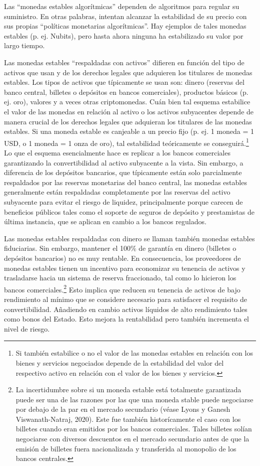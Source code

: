 \documentclass[10pt,spanish]{article}
\begin{document}
Las ``monedas estables algorítmicas'' dependen de algoritmos para
regular su suministro. En otras palabras, intentan alcanzar la
estabilidad de su precio con sus propias ``políticas monetarias
algorítmicas''. Hay ejemplos de tales monedas estables (p. ej. Nubits),
pero hasta ahora ninguna ha estabilizado su valor por largo tiempo.

Las monedas estables ``respaldadas con activos'' difieren en función del
tipo de activos que usan y de los derechos legales que adquieren los
titulares de monedas estables. Los tipos de activos que típicamente se
usan son: dinero (reservas del banco central, billetes o depósitos en
bancos comerciales), productos básicos (p. ej. oro), valores y a veces
otras criptomonedas. Cuán bien tal esquema estabilice el valor de las
monedas en relación al activo o los activos subyacentes depende de
manera crucial de los derechos legales que adquieran los titulares de
las monedas estables. Si una moneda estable es canjeable a un precio
fijo (p. ej. 1 moneda = 1 USD, o 1 moneda = 1 onza de oro), tal
estabilidad teóricamente se conseguirá.\footnote{Si también estabilice o
no el valor de las monedas estables en relación con los bienes y
servicios negociados depende de la estabilidad del valor del respectivo
activo en relación con el valor de los bienes y servicios.} Lo que el esquema
esencialmente hace es replicar a los bancos comerciales garantizando la
convertibilidad al activo subyacente a la vista. Sin embargo, a
diferencia de los depósitos bancarios, que típicamente están solo
parcialmente respaldados por las reservas monetarias del banco central,
las monedas estables generalmente están respaldadas completamente por
las reservas del activo subyacente para evitar el riesgo de liquidez,
principalmente porque carecen de beneficios públicos tales como el
soporte de seguros de depósito y prestamistas de última instancia, que
se aplican en cambio a los bancos regulados.

Las monedas estables respaldadas con dinero se llaman también monedas
estables fiduciarias. Sin embargo, mantener el 100\% de garantía en
dinero (billetes o depósitos bancarios) no es muy rentable. En
consecuencia, los proveedores de monedas estables tienen un incentivo
para economizar su tenencia de activos y trasladarse hacia un sistema de
reserva fraccionado, tal como lo hicieron los bancos comerciales.\footnote
{La incertidumbre sobre si un moneda estable está
totalmente garantizada puede ser una de las razones por las que una
moneda stable puede negociarse por debajo de la par en el mercado
secundario (véase Lyons y Ganesh Viswanath-Natraj, 2020). Este fue
también historícamente el caso con los billetes cuando eran emitidos
por los bancos comerciales. Tales billetes solían negociarse con
diversos descuentos en el mercado secundario antes de que la emisión
de billetes fuera nacionalizada y transferida al monopolio de los
bancos centrales.} Esto implica que reducen su tenencia de activos de
bajo rendimiento al mínimo que se considere necesario para satisfacer el
requisito de convertibilidad. Añadiendo en cambio activos líquidos de
alto rendimiento tales como bonos del Estado. Esto mejora la
rentabilidad pero también incrementa el nivel de riesgo.
\end{document}
